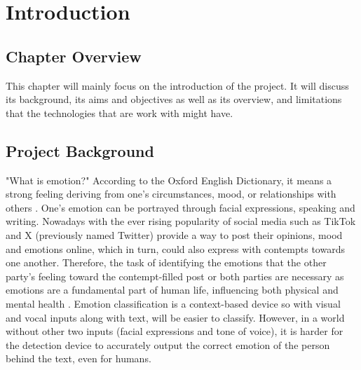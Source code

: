 
\chapter{Introduction}

\singlespaced

\section{Chapter Overview}

This chapter will mainly focus on the introduction of the project. It will discuss its background, its aims and objectives as well as its overview, and limitations that the technologies that are work with might have.

\section{Project Background}

"What is emotion?" According to the Oxford English Dictionary, it means a strong feeling deriving from one's circumstances, mood, or relationships with others \cite{oed:akrasia}.
One's emotion can be portrayed through facial expressions, speaking and writing. 
Nowadays with the ever rising popularity of social media such as TikTok and X (previously named Twitter) provide a way to post their opinions, mood and emotions online, which in turn, could also express with contempts towards one another.
Therefore, the task of identifying the emotions that the other party's feeling toward the contempt-filled post or both parties are necessary as emotions are a fundamental part of human life, influencing both physical and mental health \cite{AMEER2023118534}.
Emotion classification is a context-based device so with visual and vocal inputs along with text, will be easier to classify.
However, in a world without other two inputs (facial expressions and tone of voice), 
it is harder for the detection device to accurately output the correct emotion
of the person behind the text, even for humans.

